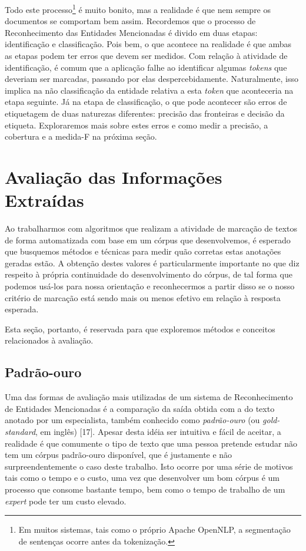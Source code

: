 \documentclass[11pt]{report}
\begin{document}
Todo este processo\footnote[3]{Em muitos sistemas, tais como o próprio Apache OpenNLP, a segmentação de sentenças ocorre antes da tokenização.} é muito bonito, mas a realidade é que nem sempre
os documentos se comportam bem assim. Recordemos que o processo de Reconhecimento das Entidades Mencionadas
é divido em duas etapas: identificação e classificação. Pois bem, o que acontece na realidade é que ambas as etapas podem ter erros que devem ser medidos. Com relação
à atividade de identificação, é comum que a aplicação falhe ao identificar algumas \textit{tokens} que deveriam ser marcadas, passando por elas despercebidamente. Naturalmente, isso
implica na não classificação da entidade relativa a esta \textit{token} que aconteceria na etapa seguinte. Já na etapa de classificação, o que pode acontecer são erros de etiquetagem
de duas naturezas diferentes: precisão das fronteiras e decisão da etiqueta. Exploraremos mais sobre estes erros e como medir a precisão, a cobertura e a medida-F na próxima seção.

\section{Avaliação das Informações Extraídas}

\indent\indent Ao trabalharmos com algoritmos que realizam a atividade de marcação de textos de forma automatizada com base em um córpus que desenvolvemos, é
esperado que busquemos métodos e técnicas para medir quão corretas estas anotações geradas estão. A obtenção destes valores é particularmente
importante no que diz respeito à própria continuidade do desenvolvimento do córpus, de tal forma que podemos usá-los para nossa orientação e
reconhecermos a partir disso se o nosso critério de marcação está sendo mais ou menos efetivo em relação à resposta esperada.

Esta seção, portanto,
é reservada para que exploremos métodos e conceitos relacionados à avaliação.

\subsection{Padrão-ouro}

\indent\indent Uma das formas de avaliação mais utilizadas de um sistema de Reconhecimento de Entidades Mencionadas é a comparação da saída obtida com a do texto anotado por
um especialista, também conhecido como \textit{padrão-ouro} (ou \textit{gold-standard}, em inglês) [17]. Apesar desta idéia ser intuitiva e fácil de aceitar, a realidade é que
comumente o tipo de texto que uma pessoa pretende estudar não tem um córpus padrão-ouro disponível, que é justamente e não surpreendentemente o caso deste trabalho. Isto ocorre
por uma série de motivos tais como o tempo e o custo, uma vez que desenvolver um bom córpus é um processo que consome bastante tempo, bem como o tempo de trabalho de um \textit{expert}
pode ter um custo elevado.
\end{document}
